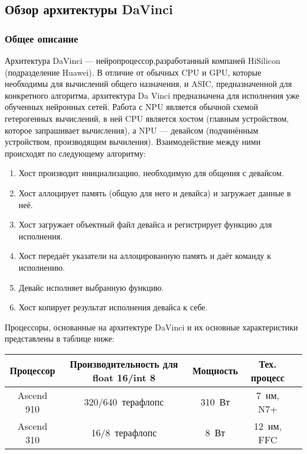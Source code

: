 \subsection{Обзор архитектуры DaVinci}
\subsubsection{Общее описание}

Архитектура DaVinci --- нейропроцессор,разработанный компаней HiSilicon
(подразделение Huawei). В отличие от обычных CPU и GPU, которые необходимы
для вычислений общего назначения, и ASIC, предназначенной для конкретного
алгоритма, архитектура Da Vinci предназначена для исполнения уже обученных
нейронных сетей. Работа с NPU является обычной схемой гетерогенных вычислений,
в ней CPU является хостом (главным устройством, которое запрашивает вычисления),
а NPU --- девайсом (подчинённым устройством, производящим вычиления).
Взаимодействие между ними происходят по следующему алгоритму:

\begin{enumerate}
    \item Хост производит инициализацию, необходимую для общения с девайсом.
    \item Хост аллоцирует память (общую для него и девайса) и загружает данные в неё.
    \item Хост загружает объектный файл девайса и регистрирует функцию для исполнения.
    \item Хост передаёт указатели на аллоцированную память и даёт команду к исполнению.
    \item Девайс исполняет выбранную функцию.
    \item Хост копирует результат исполнения девайса к себе.
\end{enumerate}

Процессоры, основанные на архитектуре DaVinci и их основные характеристики
представлены в таблице ниже:

\begin{table}[h!]
    \centering
    \begin{tabular}{|c|c|c|c|c|}
        \hline
        Процессор & Производительность для float 16/int 8 & Мощность & Тех. процесс  \\ \hline
        Ascend 910 & 320/640~терафлопс & 310~Вт & 7~нм, N7+ \\ \hline
        Ascend 310 & 16/8~терафлопс & 8~Вт & 12~нм, FFC \\ \hline
    \end{tabular}
\end{table}

